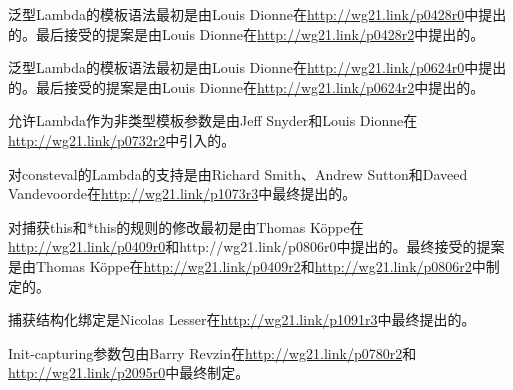 泛型Lambda的模板语法最初是由Louis Dionne在\url{http://wg21.link/p0428r0}中提出的。最后接受的提案是由Louis Dionne在\url{http://wg21.link/p0428r2}中提出的。

泛型Lambda的模板语法最初是由Louis Dionne在\url{http://wg21.link/p0624r0}中提出的。最后接受的提案是由Louis Dionne在\url{http://wg21.link/p0624r2}中提出的。

允许Lambda作为非类型模板参数是由Jeff Snyder和Louis Dionne在\url{http://wg21.link/p0732r2}中引入的。

对consteval的Lambda的支持是由Richard Smith、Andrew Sutton和Daveed Vandevoorde在\url{http://wg21.link/p1073r3}中最终提出的。

对捕获this和*this的规则的修改最初是由Thomas Köppe在\url{http://wg21.link/p0409r0}和http://wg21.link/p0806r0中提出的。最终接受的提案是由Thomas Köppe在\url{http://wg21.link/p0409r2}和\url{http://wg21.link/p0806r2}中制定的。

捕获结构化绑定是Nicolas Lesser在\url{http://wg21.link/p1091r3}中最终提出的。

Init-capturing参数包由Barry Revzin在\url{http://wg21.link/p0780r2}和\url{http://wg21.link/p2095r0}中最终制定。